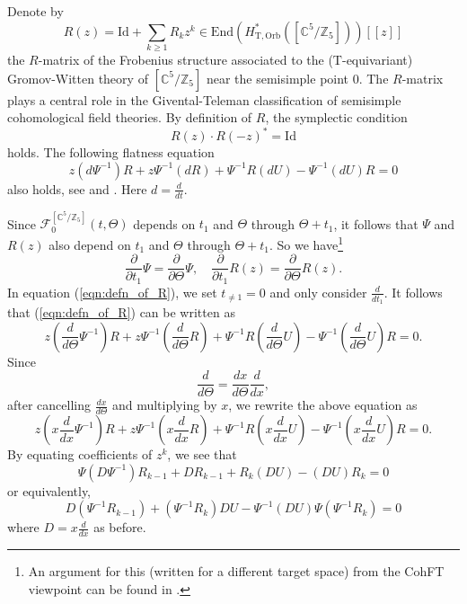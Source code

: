 \documentclass[12pt]{amsart}
\numberwithin{equation}{section}
\begin{document}
Denote by 
\begin{equation*}
    R(z)=\text{Id}+\sum_{k\geq 1} R_k z^k\in \text{End}(H^*_{\mathrm{T,Orb}}([\mathbb{C}^5/\mathbb{Z}_5]))[[z]]
\end{equation*}
the $R$-matrix of the Frobenius structure associated to the ($\mathrm{T}$-equivariant) Gromov-Witten theory of $[\mathbb{C}^5/\mathbb{Z}_5]$ near the semisimple point $0$. The $R$-matrix plays a central role in the Givental-Teleman classification of semisimple cohomological field theories. By definition of $R$, the symplectic condition 
\begin{equation*}
    R(z)\cdot R(-z)^*=\text{Id}
\end{equation*}
holds. The following flatness equation
\begin{equation}\label{eqn:defn_of_R}
z(d\Psi^{-1})R+z\Psi^{-1}(dR)+\Psi^{-1}R (dU)-\Psi^{-1}(dU) R=0    
\end{equation}
also holds, see \cite[Section 4.6]{lp} and \cite[Proposition 1.1]{g1}. Here $d=\frac{d}{dt}$.

Since $\mathcal{F}_0^{\left[\mathbb{C}^5/ \mathbb{Z}_5\right]}(t, \Theta)$ depends on $t_1$ and $\Theta$ through $\Theta+t_1$, it follows that $\Psi$ and $R(z)$ also depend on $t_1$ and $\Theta$ through $\Theta+t_1$. So we have\footnote{An argument for this (written for a different target space) from the CohFT viewpoint can be found in \cite[Section 3.3]{pt}.} 
\begin{equation*}
\frac{\partial}{\partial t_1}\Psi=\frac{\partial}{\partial \Theta} \Psi, \quad
    \frac{\partial}{\partial t_1}R(z)=\frac{\partial}{\partial \Theta} R(z).
\end{equation*}
In equation (\ref{eqn:defn_of_R}), we set $t_{\neq 1}=0$ and only consider $\frac{d}{dt_1}$. It follows that (\ref{eqn:defn_of_R}) can be written as 
\begin{equation*}
   z(\frac{d}{d\Theta}\Psi^{-1})R+z\Psi^{-1}(\frac{d}{d\Theta}R)+\Psi^{-1}R (\frac{d}{d\Theta}U)-\Psi^{-1}(\frac{d}{d\Theta}U) R=0. 
\end{equation*}
Since $$\frac{d}{d\Theta}=\frac{dx}{d\Theta}\frac{d}{dx},$$
after cancelling $\frac{dx}{d\Theta}$ and multiplying by $x$, we rewrite the above equation as 
\begin{equation*}
   z(x\frac{d}{dx}\Psi^{-1})R+z\Psi^{-1}(x\frac{d}{dx}R)+\Psi^{-1}R (x\frac{d}{dx}U)-\Psi^{-1}(x\frac{d}{dx}U) R=0. 
\end{equation*}
By equating coefficients of $z^k$, we see that 
\begin{equation}\label{flatness1}
\Psi\left(D\Psi^{-1}\right)R_{k-1}+DR_{k-1}+R_k\left(DU\right)-\left(DU\right)R_k=0
\end{equation}
or equivalently,
\begin{equation}\label{flatness2}
D\left(\Psi^{-1}R_{k-1}\right)+\left(\Psi^{-1}R_k\right)DU-\Psi^{-1}\left(DU\right)\Psi\left(\Psi^{-1}R_k\right)=0   
\end{equation}
where $D=x\frac{d}{dx}$ as before.  
\end{document}
